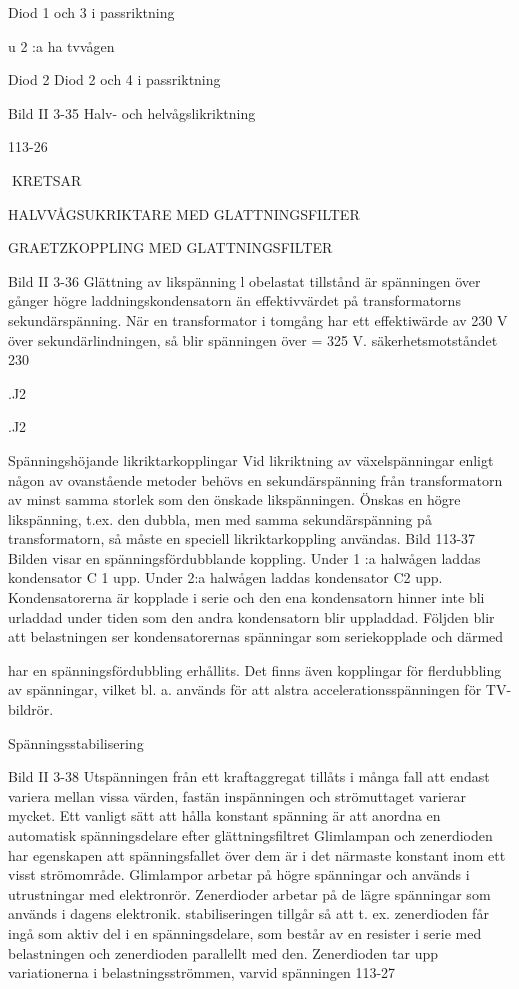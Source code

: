 \documentclass[a4paper,twoside,twocolumn,openright]{book}
\begin{document}
{{{{{{{Diod 1 och 3 i passriktning

u
2 :a ha tvvågen

Diod 2 Diod 2 och 4 i passriktning

Bild II 3-35 Halv- och helvågslikriktning

113-26

KRETSAR

HALVVÅGSUKRIKTARE MED GLATTNINGSFILTER

GRAETZKOPPLING MED GLATTNINGSFILTER

Bild II 3-36 Glättning av likspänning
l obelastat tillstånd är spänningen över
gånger högre
laddningskondensatorn
än effektivvärdet på transformatorns sekundärspänning. När en transformator i tomgång har ett effektiwärde av 230 V över
sekundärlindningen, så blir spänningen över
= 325 V.
säkerhetsmotståndet 230

.J2

.J2

Spänningshöjande likriktarkopplingar
Vid likriktning av växelspänningar enligt någon av ovanstående metoder behövs en
sekundärspänning från transformatorn av
minst samma storlek som den önskade likspänningen. Önskas en högre likspänning,
t.ex. den dubbla, men med samma sekundärspänning på transformatorn, så måste en
speciell likriktarkoppling användas.
Bild 113-37
Bilden visar en spänningsfördubblande
koppling. Under 1 :a halwågen laddas kondensator C 1 upp. Under 2:a halwågen laddas kondensator C2 upp. Kondensatorerna
är kopplade i serie och den ena kondensatorn
hinner inte bli urladdad under tiden som den
andra kondensatorn blir uppladdad. Följden
blir att belastningen ser kondensatorernas
spänningar som seriekopplade och därmed

har en spänningsfördubbling erhållits. Det
finns även kopplingar för flerdubbling av
spänningar, vilket bl. a. används för att alstra
accelerationsspänningen för TV-bildrör.

Spänningsstabilisering

Bild II 3-38
Utspänningen från ett kraftaggregat tillåts i
många fall att endast variera mellan vissa
värden, fastän inspänningen och strömuttaget varierar mycket. Ett vanligt sätt att hålla
konstant spänning är att anordna en automatisk spänningsdelare efter glättningsfiltret
Glimlampan och zenerdioden har egenskapen att spänningsfallet över dem är i det
närmaste konstant inom ett visst strömområde. Glimlampor arbetar på högre spänningar och används i utrustningar med elektronrör. Zenerdioder arbetar på de lägre
spänningar som används i dagens elektronik.
stabiliseringen tillgår så att t. ex. zenerdioden får ingå som aktiv del i en spänningsdelare, som består av en resister i serie med
belastningen och zenerdioden parallellt med
den. Zenerdioden tar upp variationerna i
belastningsströmmen, varvid spänningen
113-27

}}}}}}}
\end{document}
